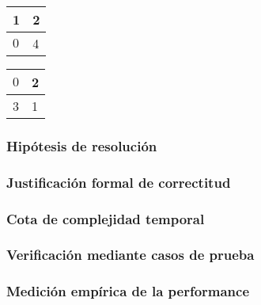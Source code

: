 \documentclass[11pt, a4paper, twoside]{article}
\begin{document}
\begin{minipage}{0.5\textwidth}
	\centering
	\begin{tabular}{ | l | l |}
		\hline 
		\bf 1  & 2 \\ 
		\hline 
		$0$  & 4 \\ 
		\hline
	\end{tabular}  
	\end{minipage}
\begin{minipage}{0.5\textwidth}
	\begin{tabular}{ | l | l |}
		\hline 
		$0$  & 2 \\ 
		\hline 
		3  & 1 \\ 
		\hline
	\end{tabular}
\end{minipage}


\subsubsection{Hipótesis de resolución}

\subsubsection{Justificación formal de correctitud}

\subsubsection{Cota de complejidad temporal}

\subsubsection{Verificación mediante casos de prueba}

\subsubsection{Medición empírica de la performance}

\end{document}
